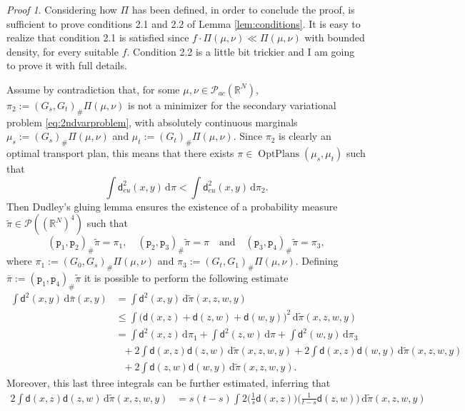 \documentclass[11pt,twoside,a4paper]{article}
\newcommand{\R}{\mathbb{R}}
\newcommand{\p}{\mathtt p} %
\newcommand{\de}{\ensuremath{\, \mathrm d}} %
\newcommand{\thmsymbol}{\( \square \)}
\newcommand{\di}{\mathsf d} %
\DeclareMathOperator{\OptPlans}{OptPlans}
\newcommand{\Prob}{\mathscr{P}}
\theoremstyle{theorem}
\theoremstyle{definition}
\theoremstyle{remark}
\theoremstyle{proof}
\newtheorem*{pro}{Proof}
\newenvironment{pr}{\begin{pro}%
 \renewcommand{\qedsymbol}{\thmsymbol}\pushQED{\qed}}%
 {\popQED\end{pro}}
\begin{document}
  
 \begin{pr}
 Considering how $\Pi$ has been defined, in order to conclude the proof, is sufficient to prove conditions 2.1 and 2.2 of Lemma \ref{lem:conditions}. It is easy to realize that condition 2.1 is satisfied since $f \cdot \Pi(\mu,\nu)\ll \Pi(\mu,\nu)$ with bounded density, for every suitable $f$. Condition 2.2 is a little bit trickier and I am going to prove it with full details.
 
 Assume by contradiction that, for some $\mu,\nu \in \Prob_{ac}(\R^N)$, $\pi_2:= (G_s,G_t)_\# \Pi(\mu,\nu)$ is not a minimizer for the secondary variational problem \eqref{eq:2ndvarproblem}, with absolutely continuous marginals $\mu_s:=(G_s)_\# \Pi(\mu,\nu)$ and $\mu_t:=(G_t)_\# \Pi(\mu,\nu)$. Since $\pi_2$ is clearly an optimal transport plan, this means that there exists $\pi \in \OptPlans(\mu_s,\mu_t)$ such that 
 \begin{equation*}
     \int \di_{eu}^2 (x,y) \de \pi < \int \di_{eu}^2 (x,y) \de \pi_2.
 \end{equation*}
 Then Dudley's gluing lemma ensures the existence of a probability measure $\tilde \pi \in \Prob((\R^N)^4)$ such that
 \begin{equation*}
     (\p_1,\p_2)_\# \tilde \pi =\pi_1, \quad
     (\p_2,\p_3)_\# \tilde \pi = \pi \quad \text{and} \quad  (\p_3,\p_4)_\# \tilde \pi =\pi_3, 
 \end{equation*}
 where $\pi_1 := (G_0,G_s)_\# \Pi(\mu,\nu)$ and $\pi_3 := (G_t,G_1)_\# \Pi(\mu,\nu)$. Defining $\bar \pi:= (\p_1,\p_4)_\# \tilde \pi$ it is possible to perform the following estimate 
 \begin{align*}
     \int \di^2(x,y) \de \bar \pi (x,y) &= \int \di^2(x,y) \de \tilde \pi (x,z,w,y)\\
     &\leq \int \big(\di(x,z)+\di(z,w)+\di(w,y)\big)^2 \de \tilde \pi (x,z,w,y)\\
     &= \int \di^2 (x,z)  \de \pi_1 + \int \di^2 (z,w)  \de \pi + \int \di^2 (w,y)  \de \pi_3 \\
     &\text{  } + 2 \int \di(x,z) \di(z,w)\de \tilde \pi (x,z,w,y) + 2 \int \di(x,z) \di(w,y)\de \tilde \pi (x,z,w,y) \\
     & \text{  } + 2 \int \di(z,w) \di(w,y)\de \tilde \pi (x,z,w,y).
 \end{align*}
 Moreover, this last three integrals can be further estimated, inferring that
 \begin{align*}
     2 \int \di(x,z) \di(z,w)\de \tilde \pi (x,z,w,y) &= s (t-s) \int 2 \bigg(\frac{1}{s} \di(x,z) \bigg) \bigg( \frac{1}{t-s}\di(z,w) \bigg) \de \tilde \pi (x,z,w,y) \\ 

\end{align*}
\end{pr}
\end{document}
